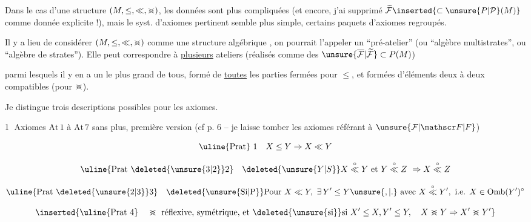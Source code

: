 Dans le cas d'une structure $(M,\leq,\ll,\mathrel{>\mkern-13mu<})$, les données sont  plus compliquées (et encore, j'ai supprimé $\widetilde{\mathcal F}\inserted{\subset\unsure{P|\mathcal P}(M)}$ comme donnée explicite !), mais le syst. d'axiomes pertinent semble plus simple,    certains paquets d'axiomes regroupés.

Il y a lieu de considérer $(M,\leq,\ll,\mathrel{>\mkern-13mu<})$ comme une structure algébrique , on pourrait l'appeler un ``pré-atelier'' (ou ``algèbre  multistrates''\deleted{\unsure{)|\}}}, ou ``algèbre de strates''). Elle peut correspondre à \uline{plusieurs} ateliers (réalisés comme des $\unsure{\overline{\mathcal F}|\widetilde{\mathcal F}}\subset P(M)$)


parmi lesquels il y en a un le plus grand de tous, formé de \uline{toutes} les parties  fermées pour $\leq$, et formées d'éléments deux à deux compatibles (pour $\mathrel{>\mkern-13mu<}$).

Je distingue trois descriptions possibles pour les axiomes.

\textcircled{1}  Axiomes $\mathrm{At}\,1$ à $\mathrm{At}\,7$ sans plus, première version (cf p. 6 -- je laisse tomber les axiomes référant à $\unsure{\mathcal F|\mathscr F|F}$)



\[
\text{\uline{Prat} 1}\quad X\leq Y\Rightarrow X\ll Y
\]


\[
\text{\uline{Prat \deleted{\unsure{3|2}}2}}\quad \deleted{\unsure{Y|S}}X\overset{\circ}{\ll}Y\ \text{et}\ Y\overset{\circ}{\ll}Z\ \Rightarrow X\overset{\circ}{\ll}Z
\]


\[
\text{\uline{Prat \deleted{\unsure{2|3}}3}}\quad
\text{\deleted{\unsure{Si|P}}Pour }X\ll Y,\ \exists\,Y'\leq Y\unsure{,|.}\ \text{avec }X\overset{\circ}{\ll}Y',\ \text{i.e. } X\in\mathrm{Omb}(Y')^{\circ}
\]

\[
\inserted{\text{\uline{Prat 4}}\quad \mathrel{>\mkern-13mu<}\ \text{réflexive, symétrique, et \deleted{\unsure{si}}si }X'\leq X,Y'\leq Y,\quad X\mathrel{>\mkern-13mu<}Y\Rightarrow X'\mathrel{>\mkern-13mu<}Y'}
\]

